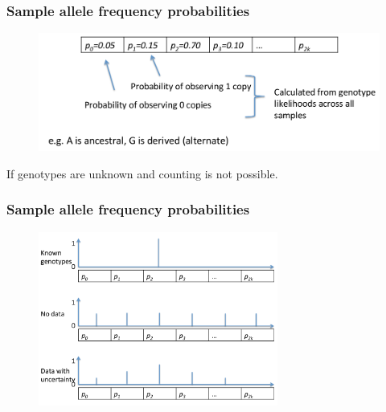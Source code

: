 \begin{frame}
\frametitle{Sample allele frequency probabilities}

        \begin{figure}
                \includegraphics[width=\textwidth]{Pics/saf_2.png}
        \end{figure}

        If genotypes are unknown and counting is not possible.

\end{frame}


\begin{frame}
\frametitle{Sample allele frequency probabilities}

        \begin{figure}
                \includegraphics[width=0.7\textwidth]{Pics/saf_3.png}
        \end{figure} 

\end{frame}



